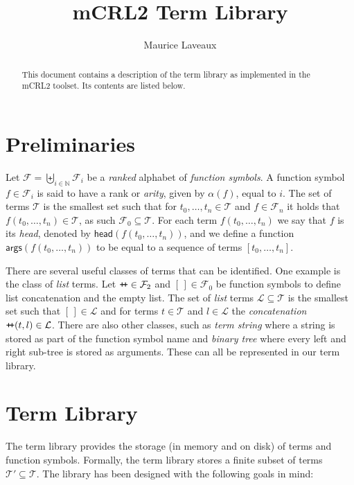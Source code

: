 \documentclass[10pt,a4paper]{article}
\author{Maurice Laveaux}
\title{mCRL2 Term Library}
\theoremstyle{definition}
\newcommand{\naturalnumbers}{\mathbb{N}}
\newcommand{\arity}{\alpha}
\newcommand{\functionsymbols}{\mathcal{F}}
\newcommand{\listempty}{[\,]}
\newcommand{\listconcat}{\texttt{+\!+}}
\newcommand{\lists}{\mathcal{L}}
\newcommand{\terms}{\mathcal{T}}
\newcommand{\head}{\mathsf{head}}
\newcommand{\args}{\textsf{args}}
\begin{document}
\maketitle

\begin{abstract}
\noindent This document contains a description of the term library as implemented in the mCRL2 toolset.
Its contents are listed below.
\end{abstract}

\tableofcontents

\newpage
\section{Preliminaries}\label{section:definitions}

Let $\functionsymbols = \biguplus_{i \in \naturalnumbers} \functionsymbols_i$ be a \emph{ranked} alphabet of  \emph{function symbols}.
A function symbol $f \in \functionsymbols_i$ is said to have a rank or \emph{arity}, given by $\arity(f)$, equal to $i$.
The set of terms $\terms$ is the smallest set such that for $t_0, \ldots, t_n \in \terms$ and $f \in \functionsymbols_n$ it holds that $f(t_0, \ldots, t_n) \in \terms$, as such $\functionsymbols_0 \subseteq \terms$.
For each term $f(t_0, \ldots, t_n)$ we say that $f$ is its \emph{head}, denoted by $\head(f(t_0, \ldots, t_n))$, and we define a function $\args(f(t_0, \ldots, t_n))$ to be equal to a sequence of terms $[t_0,\ldots,t_n]$.

There are several useful classes of terms that can be identified.
One example is the class of \emph{list} terms. 
Let $\listconcat \in \functionsymbols_2$ and $\listempty \in \functionsymbols_0$ be function symbols to define list concatenation and the empty list.
The set of \emph{list} terms $\lists \subseteq \terms$ is the smallest set such that $\listempty \in \lists$ and for terms $t \in \terms$ and $l \in \lists$ the \emph{concatenation} $\listconcat(t, l) \in \lists$.
There are also other classes, such as \emph{term string} where a string is stored as part of the function symbol name and \emph{binary tree} where every left and right sub-tree is stored as arguments.
These can all be represented in our term library.

\section{Term Library}\label{section:library}

The term library provides the storage (in memory and on disk) of terms and function symbols. 
Formally, the term library stores a finite subset of terms $\terms' \subseteq \terms$.
The library has been designed with the following goals in mind:
\end{document}

